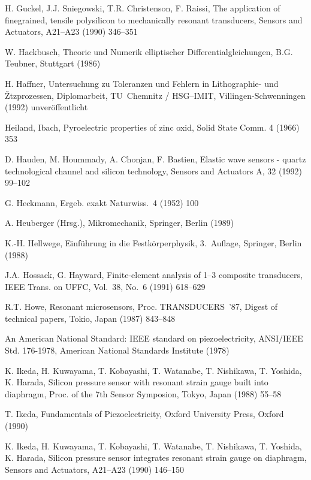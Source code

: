\begin{thebibliography}{xxx}
 H. Guckel, J.J. Sniegowski, T.R. Christenson, F. Raissi, The application of
 finegrained, tensile polysilicon to mechanically resonant transducers,
 Sensors and Actuators, A21--A23 (1990) 346--351

 W. Hackbusch, Theorie und Numerik elliptischer Differentialgleichungen,
 B.G. Teubner, Stuttgart (1986)

 H. Haffner, Untersuchung zu Toleranzen und Fehlern in Lithographie- und
 Žtzprozessen, Diplomarbeit, TU~Chemnitz / HSG--IMIT, Villingen-Schwenningen
 (1992) unveröffentlicht

 Heiland, Ibach, Pyroelectric properties of zinc oxid, Solid State Comm.
 4 (1966) 353

 D. Hauden, M. Hoummady, A. Chonjan, F. Bastien, Elastic wave sensors -
 quartz technological channel and silicon technology, Sensors and Actuators
 A, 32 (1992) 99--102

 G. Heckmann, Ergeb. exakt Naturwiss.~4 (1952) 100

 A. Heuberger (Hrsg.), Mikromechanik, Springer, Berlin (1989)

 K.-H. Hellwege, Einführung in die Festkörperphysik, 3.~Auflage,
 Springer, Berlin (1988)

 J.A. Hossack, G. Hayward, Finite-element analysis of 1--3 composite
 transducers, IEEE Trans. on UFFC, Vol.~38, No.~6 (1991) 618--629

 R.T. Howe, Resonant microsensors, Proc. TRANSDUCERS~'87, Digest of
 technical papers, Tokio, Japan (1987) 843--848

 An American National Standard: IEEE standard on piezoelectricity,
 ANSI/IEEE Std. 176-1978, American National Standards Institute (1978)

 K. Ikeda, H. Kuwayama, T. Kobayashi, T. Watanabe, T. Nishikawa, T. Yoshida,
 K. Harada, Silicon pressure sensor with resonant strain gauge built into
 diaphragm, Proc. of the 7th Sensor Symposion, Tokyo, Japan (1988) 55--58

 T. Ikeda, Fundamentals of Piezoelectricity, Oxford University Press,
 Oxford (1990)

 K. Ikeda, H. Kuwayama, T. Kobayashi, T. Watanabe, T. Nishikawa, T. Yoshida,
 K. Harada, Silicon pressure sensor integrates resonant strain gauge on
 diaphragm, Sensors and Actuators, A21--A23 (1990) 146--150


\end{thebibliography}
